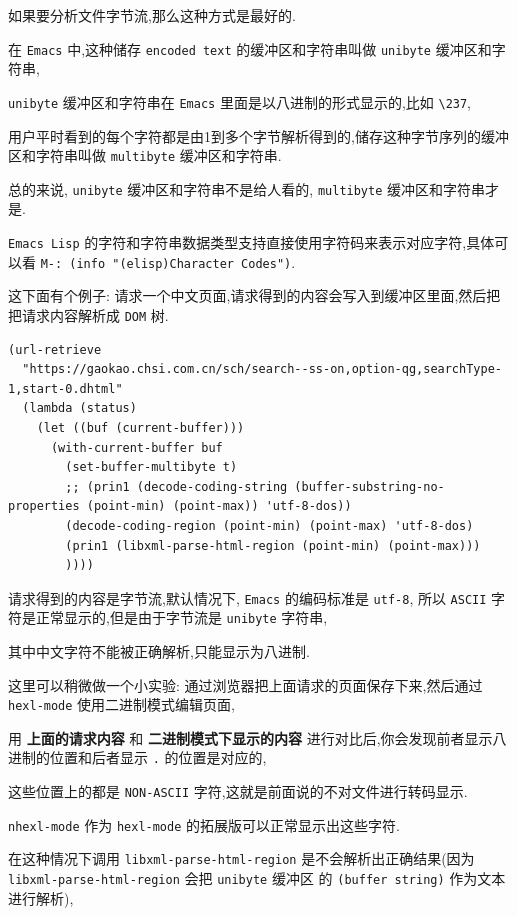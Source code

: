 \documentclass[11pt]{article}
\begin{document}
如果要分析文件字节流,那么这种方式是最好的.

在 \texttt{Emacs} 中,这种储存 \texttt{encoded text} 的缓冲区和字符串叫做 \texttt{unibyte} 缓冲区和字符串,

\texttt{unibyte} 缓冲区和字符串在 \texttt{Emacs} 里面是以八进制的形式显示的,比如 \texttt{\textbackslash{}237},

用户平时看到的每个字符都是由1到多个字节解析得到的,储存这种字节序列的缓冲区和字符串叫做 \texttt{multibyte} 缓冲区和字符串.

总的来说, \texttt{unibyte} 缓冲区和字符串不是给人看的, \texttt{multibyte} 缓冲区和字符串才是.

\texttt{Emacs Lisp} 的字符和字符串数据类型支持直接使用字符码来表示对应字符,具体可以看 \texttt{M-: (info "(elisp)Character Codes")}.

这下面有个例子: 请求一个中文页面,请求得到的内容会写入到缓冲区里面,然后把把请求内容解析成 \texttt{DOM} 树.

\begin{verbatim}
(url-retrieve
  "https://gaokao.chsi.com.cn/sch/search--ss-on,option-qg,searchType-1,start-0.dhtml"
  (lambda (status)
    (let ((buf (current-buffer)))
      (with-current-buffer buf
        (set-buffer-multibyte t)
        ;; (prin1 (decode-coding-string (buffer-substring-no-properties (point-min) (point-max)) 'utf-8-dos))
        (decode-coding-region (point-min) (point-max) 'utf-8-dos)
        (prin1 (libxml-parse-html-region (point-min) (point-max)))
        ))))
\end{verbatim}

请求得到的内容是字节流,默认情况下, \texttt{Emacs} 的编码标准是 \texttt{utf-8}, 所以 \texttt{ASCII} 字符是正常显示的,但是由于字节流是 \texttt{unibyte} 字符串,

其中中文字符不能被正确解析,只能显示为八进制.

这里可以稍微做一个小实验: 通过浏览器把上面请求的页面保存下来,然后通过 \texttt{hexl-mode} 使用二进制模式编辑页面,

用 \textbf{上面的请求内容} 和 \textbf{二进制模式下显示的内容} 进行对比后,你会发现前者显示八进制的位置和后者显示 \texttt{.} 的位置是对应的,

这些位置上的都是 \texttt{NON-ASCII} 字符,这就是前面说的不对文件进行转码显示.

\texttt{nhexl-mode} 作为 \texttt{hexl-mode} 的拓展版可以正常显示出这些字符.

在这种情况下调用 \texttt{libxml-parse-html-region} 是不会解析出正确结果(因为 \texttt{libxml-parse-html-region} 会把 \texttt{unibyte} 缓冲区 的 \texttt{(buffer string)} 作为文本进行解析),
\end{document}
